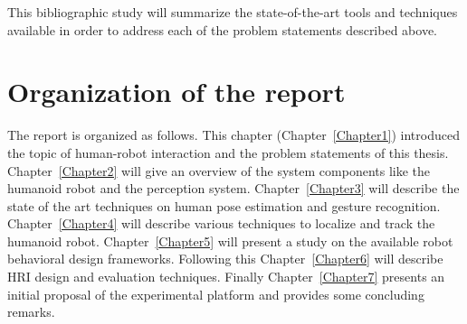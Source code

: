 
	This bibliographic study will summarize the state-of-the-art tools and techniques available in order to address each of the problem statements described above.

\section{Organization of the report}
	The report is organized as follows. This chapter (Chapter~\ref{Chapter1}) introduced the topic of human-robot interaction and the problem statements of this thesis. Chapter~\ref{Chapter2} will give an overview of the system components like the humanoid robot and the perception system. Chapter~\ref{Chapter3} will describe the state of the art techniques on human pose estimation and gesture recognition. Chapter~\ref{Chapter4} will describe various techniques to localize and track the humanoid robot. Chapter~\ref{Chapter5} will present a study on the available robot behavioral design frameworks. Following this Chapter~\ref{Chapter6} will describe HRI design and evaluation techniques. Finally Chapter~\ref{Chapter7} presents an initial proposal of the experimental platform and provides some concluding remarks.